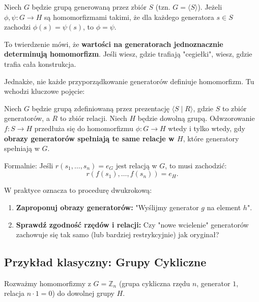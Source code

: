 \begin{theorem}[Jednoznaczność]
Niech $G$ będzie grupą generowaną przez zbiór $S$ (tzn. $G = \langle S \rangle$). Jeżeli $\phi, \psi: G \to H$ są homomorfizmami takimi, że dla każdego generatora $s \in S$ zachodzi $\phi(s) = \psi(s)$, to $\phi = \psi$.
\end{theorem}

\begin{intuition}
To twierdzenie mówi, że \textbf{wartości na generatorach jednoznacznie determinują homomorfizm}. Jeśli wiesz, gdzie trafiają "cegiełki", wiesz, gdzie trafia cała konstrukcja.
\end{intuition}

Jednakże, nie każde przyporządkowanie generatorów definiuje homomorfizm. Tu wchodzi kluczowe pojęcie:

\begin{theorem}
Niech $G$ będzie grupą zdefiniowaną przez prezentację $\langle S \mid R \rangle$, gdzie $S$ to zbiór generatorów, a $R$ to zbiór relacji.
Niech $H$ będzie dowolną grupą.
Odwzorowanie $f: S \to H$ przedłuża się do homomorfizmu $\phi: G \to H$ wtedy i tylko wtedy, gdy \textbf{obrazy generatorów spełniają te same relacje w $H$}, które generatory spełniają w $G$.

Formalnie: Jeśli $r(s_1, \dots, s_n) = e_G$ jest relacją w $G$, to musi zachodzić:
\[ r(f(s_1), \dots, f(s_n)) = e_H. \]
\end{theorem}

\begin{remark}
W praktyce oznacza to procedurę dwukrokową:
\begin{enumerate}
    \item \textbf{Zaproponuj obrazy generatorów:} "Wyślijmy generator $g$ na element $h$".
    \item \textbf{Sprawdź zgodność rzędów i relacji:} Czy "nowe wcielenie" generatorów zachowuje się tak samo (lub bardziej restrykcyjnie) jak oryginał?
\end{enumerate}
\end{remark}

\subsection{Przykład klasyczny: Grupy Cykliczne}

Rozważmy homomorfizmy z $G = \mathbb{Z}_n$ (grupa cykliczna rzędu $n$, generator $1$, relacja $n \cdot 1 = 0$) do dowolnej grupy $H$.

